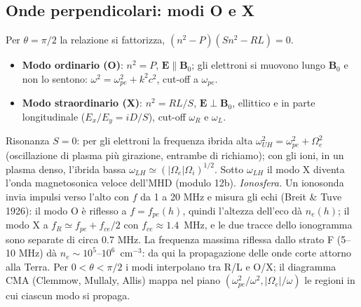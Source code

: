 \subsection{Onde perpendicolari: modi O e X}
Per $\theta=\pi/2$ la relazione si fattorizza, $(n^2-P)(Sn^2-RL)=0$.
\begin{itemize}
\item \textbf{Modo ordinario (O)}: $n^2=P$, $\mathbf{E}\parallel\mathbf{B}_0$; gli elettroni si muovono lungo $\mathbf{B}_0$ e non lo sentono: $\omega^2=\omega_{pe}^2+k^2c^2$, cut-off a $\omega_{pe}$.
\item \textbf{Modo straordinario (X)}: $n^2=RL/S$, $\mathbf{E}\perp\mathbf{B}_0$, ellittico e in parte longitudinale ($E_x/E_y=iD/S$), cut-off $\omega_R$ e $\omega_L$.
\end{itemize}
Risonanza $S=0$: per gli elettroni la frequenza ibrida alta $\omega_{UH}^2=\omega_{pe}^2+\Omega_e^2$ (oscillazione di plasma più girazione, entrambe di richiamo); con gli ioni, in un plasma denso, l'ibrida bassa $\omega_{LH}\simeq(|\Omega_e|\Omega_i)^{1/2}$. Sotto $\omega_{LH}$ il modo X diventa l'onda magnetosonica veloce dell'MHD (modulo 12b).
\emph{Ionosfera.} Un ionosonda invia impulsi verso l'alto con $f$ da 1 a 20 MHz e misura gli echi (Breit \& Tuve 1926): il modo O è riflesso a $f=f_{pe}(h)$, quindi l'altezza dell'eco dà $n_e(h)$; il modo X a $f_R\simeq f_{pe}+f_{ce}/2$ con $f_{ce}\approx1.4$~MHz, e le due tracce dello ionogramma sono separate di circa 0.7 MHz. La frequenza massima riflessa dallo strato F (5--10 MHz) dà $n_e\sim10^{5}$--$10^6$~cm$^{-3}$: da qui la propagazione delle onde corte attorno alla Terra. Per $0<\theta<\pi/2$ i modi interpolano tra R/L e O/X; il diagramma CMA (Clemmow, Mullaly, Allis) mappa nel piano $(\omega_{pe}^2/\omega^2,|\Omega_e|/\omega)$ le regioni in cui ciascun modo si propaga.

